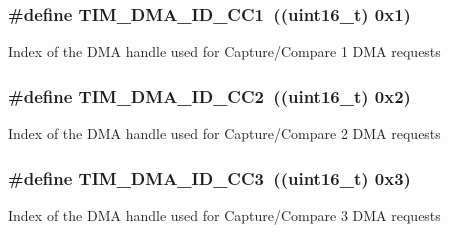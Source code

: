\subsubsection[{\texorpdfstring{T\+I\+M\+\_\+\+D\+M\+A\+\_\+\+I\+D\+\_\+\+C\+C1}{TIM_DMA_ID_CC1}}]{\setlength{\rightskip}{0pt plus 5cm}\#define T\+I\+M\+\_\+\+D\+M\+A\+\_\+\+I\+D\+\_\+\+C\+C1~((uint16\+\_\+t) 0x1)}\hypertarget{group___d_m_a___handle__index_ga7ca691eb5e29b0206d3390cc6e90079a}{}\label{group___d_m_a___handle__index_ga7ca691eb5e29b0206d3390cc6e90079a}
Index of the D\+MA handle used for Capture/\+Compare 1 D\+MA requests 
\subsubsection[{\texorpdfstring{T\+I\+M\+\_\+\+D\+M\+A\+\_\+\+I\+D\+\_\+\+C\+C2}{TIM_DMA_ID_CC2}}]{\setlength{\rightskip}{0pt plus 5cm}\#define T\+I\+M\+\_\+\+D\+M\+A\+\_\+\+I\+D\+\_\+\+C\+C2~((uint16\+\_\+t) 0x2)}\hypertarget{group___d_m_a___handle__index_ga9c52f32d4bd21dd2d232900219f0a111}{}\label{group___d_m_a___handle__index_ga9c52f32d4bd21dd2d232900219f0a111}
Index of the D\+MA handle used for Capture/\+Compare 2 D\+MA requests 
\subsubsection[{\texorpdfstring{T\+I\+M\+\_\+\+D\+M\+A\+\_\+\+I\+D\+\_\+\+C\+C3}{TIM_DMA_ID_CC3}}]{\setlength{\rightskip}{0pt plus 5cm}\#define T\+I\+M\+\_\+\+D\+M\+A\+\_\+\+I\+D\+\_\+\+C\+C3~((uint16\+\_\+t) 0x3)}\hypertarget{group___d_m_a___handle__index_ga6e8145f305b54744bf2ef379a4315a40}{}\label{group___d_m_a___handle__index_ga6e8145f305b54744bf2ef379a4315a40}
Index of the D\+MA handle used for Capture/\+Compare 3 D\+MA requests 
